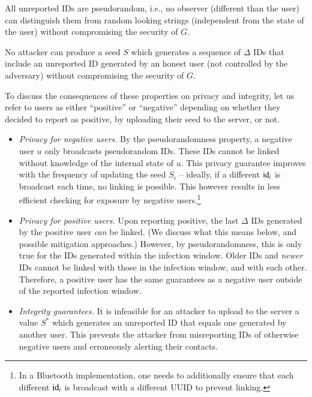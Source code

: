 \begin{proposition}[Pseudorandomness]
   All unreported IDs are pseudorandom, i.e., no observer (different than the user) can distinguish them from random looking strings (independent from the state of the user) without compromising the security of $G$.
\end{proposition}

\begin{proposition}
   No attacker can produce a seed $S$ which generates a sequence of $\Delta$ IDs that include an unreported ID generated by an honest user (not controlled by the adversary) without compromising the security of $G$.
\end{proposition}

To discuss the consequences of these properties on privacy and integrity, let us refer to users as either ``positive'' or ``negative'' depending on whether they decided to report as positive, by uploading their seed to the server, or not. 
\begin{itemize}
    \item {\em Privacy for negative users.}  By the pseudorandomness property, a negative user $u$ only broadcasts pseudorandom IDs. These IDs cannot be linked without knowledge of the internal state of $u$. This privacy guarantee improves with the frequency of updating the seed $S_i$ -- ideally, if a different $\mathrm{id}_i$ is broadcast each time, no linking is possible. This however results in less efficient checking for exposure by negative users.\footnote{In a Bluetooth implementation, one needs to additionally ensure that each different $\mathrm{id}_i$ is broadcast with a different UUID to prevent linking.}
    \item {\em Privacy for positive users.} Upon reporting positive, the last $\Delta$ IDs generated by the positive user {\em can} be linked. (We discuss what this means below, and possible mitigation approaches.) However, by pseudorandomness, this is only true for the IDs generated within the infection window. Older IDs and {\em newer} IDs cannot be linked with those in the infection window, and with each other. Therefore, a positive user has the same guarantees as a negative user outside of the reported infection window.
    \item {\em Integrity guarantees.} It is infeasible for an attacker to upload to the server a value $S^*$ which generates an unreported ID that equals one generated by another user. This prevents the attacker from misreporting IDs of otherwise negative users and erroneously alerting their contacts.  
\end{itemize}

